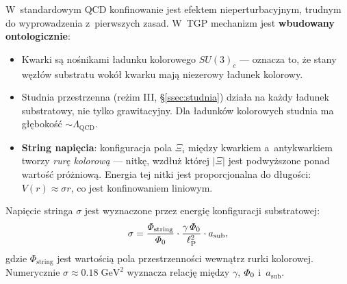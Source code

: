 \begin{remark}%
\label{rem:confinement}
W~standardowym QCD konfinowanie jest efektem nieperturbacyjnym,
trudnym do wyprowadzenia z~pierwszych zasad. W~TGP mechanizm
jest \textbf{wbudowany ontologicznie}:

\begin{itemize}[nosep]
    \item Kwarki są nośnikami ładunku kolorowego $SU(3)_c$
          --- oznacza to, że stany węzłów substratu wokół kwarku
          mają niezerowy ładunek kolorowy.
    \item Studnia przestrzenna (reżim III, \S\ref{ssec:studnia})
          działa na każdy ładunek substratowy, nie tylko
          grawitacyjny. Dla ładunków kolorowych studnia
          ma głębokość $\sim \Lambda_{\mathrm{QCD}}$.
    \item \textbf{String napięcia}: konfiguracja pola $\Xi_i$
          między kwarkiem a~antykwarkiem tworzy \emph{rurę
          kolorową} --- nitkę, wzdłuż której $|\Xi|$ jest
          podwyższone ponad wartość próżniową. Energia tej
          nitki jest proporcjonalna do długości: $V(r) \approx \sigma r$,
          co jest konfinowaniem liniowym.
\end{itemize}

Napięcie stringa $\sigma$ jest wyznaczone przez energię
konfiguracji substratowej:
\begin{equation}\label{eq:string-tension}
    \sigma = \frac{\varPhi_{\mathrm{string}}}{\varPhi_0} \cdot
    \frac{\gamma\,\varPhi_0}{\ell_{\mathrm{P}}^2} \cdot a_{\mathrm{sub}},
\end{equation}
gdzie $\Phi_{\mathrm{string}}$ jest wartością pola przestrzenności
wewnątrz rurki kolorowej. Numerycznie $\sigma \approx 0.18\;\mathrm{GeV}^2$
wyznacza relację między $\gamma$, $\varPhi_0$ i~$a_{\mathrm{sub}}$.
\end{remark}

